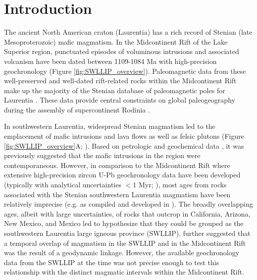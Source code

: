 \section{Introduction}

The ancient North American craton (Laurentia) has a rich record of Stenian (late Mesoproterozoic) mafic magmatism. In the Midcontinent Rift of the Lake Superior region, punctuated episodes of voluminous intrusions and associated volcanism have been dated between 1109-1084 Ma with high-precision geochronology (Figure \ref{fig:SWLLIP_overview}). Paleomagnetic data from these well-preserved and well-dated rift-related rocks within the Midcontinent Rift make up the majority of the Stenian database of paleomagnetic poles for Laurentia \citep{Evans2021a}. These data provide central constraints on global paleogeography during the assembly of supercontinent Rodinia \citep{Swanson-Hysell2021c, Evans2021b}. 

In southwestern Laurentia, widespread Stenian magmatism led to the emplacement of mafic intrusions and lava flows as well as felsic plutons (Figure \ref{fig:SWLLIP_overview}A; \citealp{Wrucke1966a, Shride1967a, Hendricks1972a, Howard1991a, Bright2014a}). Based on petrologic and geochemical data \cite[e.g.][]{Wrucke1966a, Wrucke1972a, Hammond1986a}, it was previously suggested that the mafic intrusions in the region were contemporaneous. However, in comparison to the Midcontinent Rift where extensive high-precision zircon U-Pb geochronology data have been developed (typically with analytical uncertainties $<$1 Myr; \citealp[e.g.][]{Swanson-Hysell2019a}), most ages from rocks associated with the Stenian southwestern Laurentia magmatism have been relatively imprecise (e.g. as compiled and developed in \cite{Bright2014a}). The broadly overlapping ages, albeit with large uncertainties, of rocks that outcrop in California, Arizona, New Mexico, and Mexico led \cite{Bright2014a} to hypothesize that they could be grouped as the southwestern Laurentia large igneous province (SWLLIP). \cite{Bright2014a} further suggested that a temporal overlap of magmatism in the SWLLIP and in the Midcontinent Rift was the result of a geodynamic linkage. However, the available geochronology data from the SWLLIP at the time was not precise enough to test this relationship with the distinct magmatic intervals within the Midcontinent Rift. 


